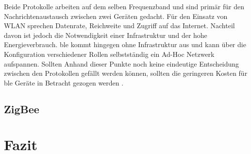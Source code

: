 \noindent Beide Protokolle arbeiten auf dem selben Frequenzband und sind primär für den Nachrichtenaustausch zwischen zwei Geräten gedacht. Für den Einsatz von WLAN sprechen Datenrate, Reichweite und Zugriff auf das Internet. Nachteil davon ist jedoch die Notwendigkeit einer Infrastruktur und der hohe Energieverbrauch. \ac{ble} kommt hingegen ohne Infrastruktur aus und kann über die Konfiguration verschiedener Rollen selbstständig ein Ad-Hoc Netzwerk aufspannen. Sollten Anhand dieser Punkte noch keine eindeutige Entscheidung zwischen den Protokollen gefällt werden können, sollten die geringeren Kosten für \ac{ble} Geräte in Betracht gezogen werden \cite[Seite 271]{Gessler15:WNN}.\\   

\subsection{ZigBee}
\label{ss:vergleich:zigbee}

\noindent 

\section{Fazit}
\label{s:fazit}

  
